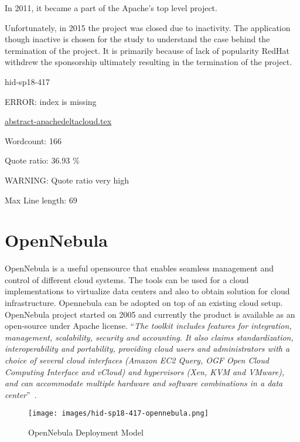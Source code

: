 In 2011, it became a part of the Apache's top level project. 

Unfortunately, in 2015 the project was closed due to inactivity.  The
application though inactive is chosen for the study to understand the
case behind the termination of the project.  It is primarily because
of lack of popularity RedHat withdrew the sponsorship ultimately
resulting in the termination of the project.


\begin{IU}

hid-sp18-417

ERROR: index is missing

\href{https://github.com/cloudmesh-community/hid-sp18-417/blob/master//technology/abstract-apachedeltacloud.tex}{abstract-apachedeltacloud.tex}

 

Wordcount: 166


Quote ratio: 36.93 \%

WARNING: Quote ratio very high
 
Max Line length: 69
\end{IU}


\section{OpenNebula}

OpenNebula is a useful opensource that enables seamless management and
control of different cloud systems.  The tools can be used for a cloud
implementations to virtualize data centers and also to obtain solution
for cloud infrastructure.  Opennebula can be adopted on top of an
existing cloud setup.  OpenNebula project started on 2005 and
currently the product is available as an open-source under Apache
license.
\color{blue}``\emph{The toolkit includes features for integration, management,
scalability, security and accounting.  It also claims standardization,
interoperability and portability, providing cloud users and
administrators with a choice of several cloud interfaces (Amazon EC2
Query, OGF Open Cloud Computing Interface and vCloud) and hypervisors
(Xen, KVM and VMware), and can accommodate multiple hardware and
software combinations in a data
center}''\color{black}~\cite{hid-sp18-417-opennebula-wiki}.

\begin{figure}[htb]
\texttt{[image: images/hid-sp18-417-opennebula.png]}
\caption{OpenNebula Deployment Model~\cite{hid-sp18-417-opennebula-deployment}} 
\label{F:opennebula}
\end{figure}


